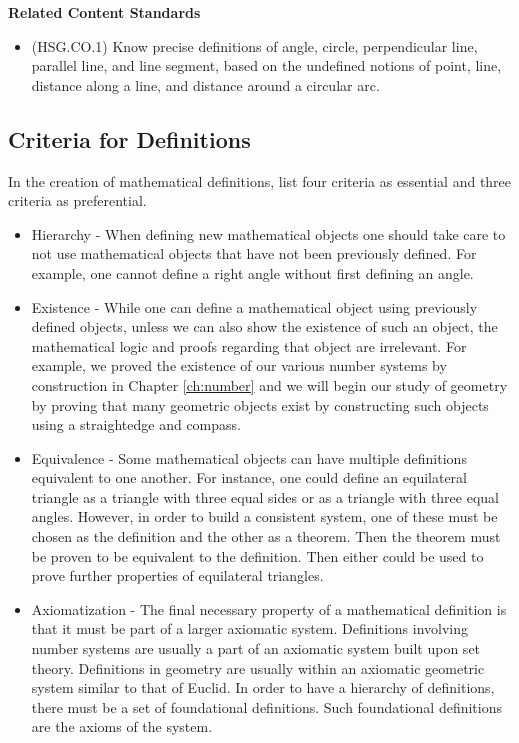 \documentclass[
]{book}
\providecommand{\tightlist}{%
  \setlength{\itemsep}{0pt}\setlength{\parskip}{0pt}}
\newenvironment{standards}{}{}
\theoremstyle{definition}
\theoremstyle{definition}
\theoremstyle{definition}
\theoremstyle{definition}
\theoremstyle{remark}
\begin{document}
\begin{standards}

\begin{center}
\textbf{Related Content Standards}

\end{center}

\begin{itemize}
\tightlist
\item
  (HSG.CO.1) Know precise definitions of angle, circle, perpendicular line, parallel line, and line segment, based on the undefined notions of point, line, distance along a line, and distance around a circular arc.
\end{itemize}

\end{standards}

\hypertarget{criteria-for-definitions}{%
\subsection{Criteria for Definitions}\label{criteria-for-definitions}}

In the creation of mathematical definitions, \citet{Dormolen2003} list four criteria as essential and three criteria as preferential.

\begin{itemize}
\item
  Hierarchy - When defining new mathematical objects one should take care to not use mathematical objects that have not been previously defined. For example, one cannot define a right angle without first defining an angle.
\item
  Existence - While one can define a mathematical object using previously defined objects, unless we can also show the existence of such an object, the mathematical logic and proofs regarding that object are irrelevant. For example, we proved the existence of our various number systems by construction in Chapter \ref{ch:number} and we will begin our study of geometry by proving that many geometric objects exist by constructing such objects using a straightedge and compass.
\item
  Equivalence - Some mathematical objects can have multiple definitions equivalent to one another. For instance, one could define an equilateral triangle as a triangle with three equal sides or as a triangle with three equal angles. However, in order to build a consistent system, one of these must be chosen as the definition and the other as a theorem. Then the theorem must be proven to be equivalent to the definition. Then either could be used to prove further properties of equilateral triangles.
\item
  Axiomatization - The final necessary property of a mathematical definition is that it must be part of a larger axiomatic system. Definitions involving number systems are usually a part of an axiomatic system built upon set theory. Definitions in geometry are usually within an axiomatic geometric system similar to that of Euclid. In order to have a hierarchy of definitions, there must be a set of foundational definitions. Such foundational definitions are the axioms of the system.
\end{itemize}
\end{document}

